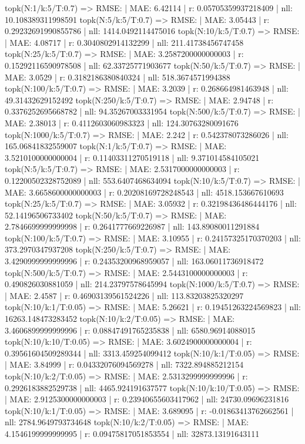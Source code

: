 topk(N:1/k:5/T:0.7) => RMSE: | MAE: 6.42114 | r: 0.05705359937218409 | nll: 10.108389311998591
topk(N:5/k:5/T:0.7) => RMSE: | MAE: 3.05443 | r: 0.29232691990855786 | nll: 1414.0492114475016
topk(N:10/k:5/T:0.7) => RMSE: | MAE: 4.08717 | r: 0.3040802914132299 | nll: 211.41738456747458
topk(N:25/k:5/T:0.7) => RMSE: | MAE: 3.2587200000000003 | r: 0.15292116590978508 | nll: 62.33725771903677
topk(N:50/k:5/T:0.7) => RMSE: | MAE: 3.0529 | r: 0.3182186380840324 | nll: 518.3674571994388
topk(N:100/k:5/T:0.7) => RMSE: | MAE: 3.2039 | r: 0.268664981463948 | nll: 49.31432629152492
topk(N:250/k:5/T:0.7) => RMSE: | MAE: 2.94748 | r: 0.3376252695668782 | nll: 94.35267003331954
topk(N:500/k:5/T:0.7) => RMSE: | MAE: 2.38013 | r: 0.4112603060983323 | nll: 124.30763280091676
topk(N:1000/k:5/T:0.7) => RMSE: | MAE: 2.242 | r: 0.542378073286026 | nll: 165.06841832559007
topk(N:1/k:5/T:0.7) => RMSE: | MAE: 3.5210100000000004 | r: 0.11403311270519118 | nll: 9.371014584105021
topk(N:5/k:5/T:0.7) => RMSE: | MAE: 2.5317000000000003 | r: 0.12200502328752089 | nll: 553.6407468634094
topk(N:10/k:5/T:0.7) => RMSE: | MAE: 3.6658600000000003 | r: 0.20208169728248543 | nll: 4518.153667610693
topk(N:25/k:5/T:0.7) => RMSE: | MAE: 3.05932 | r: 0.32198436486444176 | nll: 52.14196506733402
topk(N:50/k:5/T:0.7) => RMSE: | MAE: 2.7846699999999998 | r: 0.2641777669226987 | nll: 143.89080011291884
topk(N:100/k:5/T:0.7) => RMSE: | MAE: 3.10955 | r: 0.24157325170370203 | nll: 373.2970347937208
topk(N:250/k:5/T:0.7) => RMSE: | MAE: 3.4290999999999996 | r: 0.24353200968959057 | nll: 163.06011736918472
topk(N:500/k:5/T:0.7) => RMSE: | MAE: 2.5443100000000003 | r: 0.490826030881059 | nll: 214.23797578645994
topk(N:1000/k:5/T:0.7) => RMSE: | MAE: 2.4587 | r: 0.46903139561524226 | nll: 113.83203825320297
topk(N:10/k:1/T:0.05) => RMSE: | MAE: 5.26621 | r: 0.19451263224569823 | nll: 16263.148473283452
topk(N:10/k:2/T:0.05) => RMSE: | MAE: 3.4606899999999996 | r: 0.08847491765235838 | nll: 6580.96914088015
topk(N:10/k:10/T:0.05) => RMSE: | MAE: 3.6024900000000004 | r: 0.39561604509289344 | nll: 3313.459254099412
topk(N:10/k:1/T:0.05) => RMSE: | MAE: 3.84999 | r: 0.04332076094569278 | nll: 7322.894885212154
topk(N:10/k:2/T:0.05) => RMSE: | MAE: 2.5313299999999996 | r: 0.2926183882529738 | nll: 4465.924191637577
topk(N:10/k:10/T:0.05) => RMSE: | MAE: 2.9125300000000003 | r: 0.23940655603417962 | nll: 24730.09696231816
topk(N:10/k:1/T:0.05) => RMSE: | MAE: 3.689095 | r: -0.01863413762662561 | nll: 2784.9649793734648
topk(N:10/k:2/T:0.05) => RMSE: | MAE: 4.1546199999999995 | r: 0.09475817051853554 | nll: 32873.13191643111
